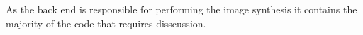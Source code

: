 As the back end is responsible for performing the image synthesis it contains the majority of the code that requires disscussion.

\newpage

\newpage


